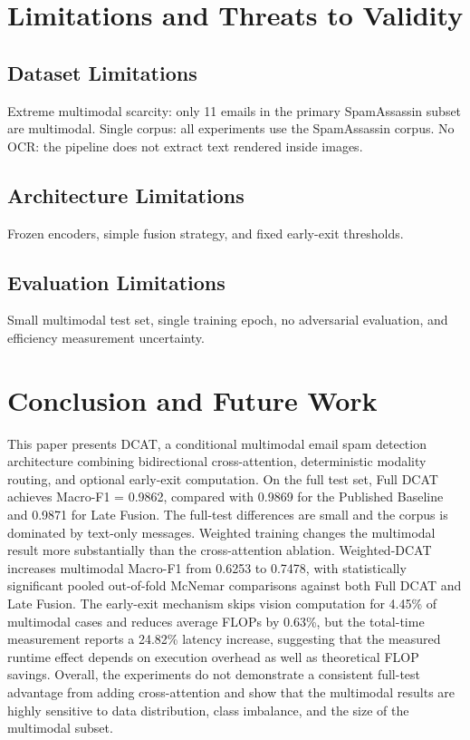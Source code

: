 \documentclass[conference]{IEEEtran}
\begin{document}
\section{Limitations and Threats to Validity}
\subsection{Dataset Limitations}
Extreme multimodal scarcity: only 11 emails in the primary SpamAssassin subset are multimodal. Single corpus: all experiments use the SpamAssassin corpus. No OCR: the pipeline does not extract text rendered inside images.
\subsection{Architecture Limitations}
Frozen encoders, simple fusion strategy, and fixed early-exit thresholds.
\subsection{Evaluation Limitations}
Small multimodal test set, single training epoch, no adversarial evaluation, and efficiency measurement uncertainty.

\section{Conclusion and Future Work}
This paper presents DCAT, a conditional multimodal email spam detection architecture combining bidirectional cross-attention, deterministic modality routing, and optional early-exit computation.
On the full test set, Full DCAT achieves Macro-F1 = 0.9862, compared with 0.9869 for the Published Baseline and 0.9871 for Late Fusion. The full-test differences are small and the corpus is dominated by text-only messages.
Weighted training changes the multimodal result more substantially than the cross-attention ablation. Weighted-DCAT increases multimodal Macro-F1 from 0.6253 to 0.7478, with statistically significant pooled out-of-fold McNemar comparisons against both Full DCAT and Late Fusion.
The early-exit mechanism skips vision computation for 4.45\% of multimodal cases and reduces average FLOPs by 0.63\%, but the total-time measurement reports a 24.82\% latency increase, suggesting that the measured runtime effect depends on execution overhead as well as theoretical FLOP savings.
Overall, the experiments do not demonstrate a consistent full-test advantage from adding cross-attention and show that the multimodal results are highly sensitive to data distribution, class imbalance, and the size of the multimodal subset.
\end{document}
